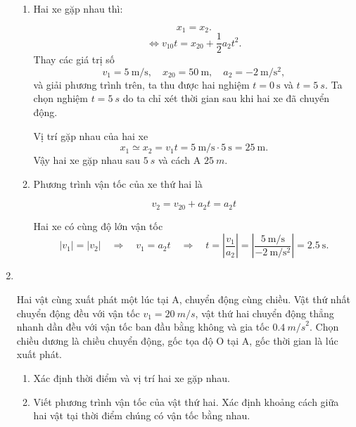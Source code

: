 \begin{enumerate}[label=\bfseries Bài \arabic*:,leftmargin=1.5cm]
{\begin{enumerate}[label=\alph*.]
		$$x_\text{1} = x_{10}+v_{1}t = v_{1}t.$$
		
		$$x_\text{2} = x_{20} + v_{20}t +\dfrac{1}{2}a_2t^2 = x_{20} +\dfrac{1}{2}a_2 t^2.$$
		\item Hai xe gặp nhau thì:
		
		$$x_{1} = x_{2}.$$
		$$\Leftrightarrow  v_{10}t= x_{20} +\dfrac{1}{2}a_2 t^2.$$
		Thay các giá trị số 
		$$v_{1}=\SI{5}{\meter/\second},\quad x_{20}=\SI{50}{\meter},\quad a_2=\SI{-2}{\meter/\second^{2}},$$
		và giải phương trình trên, ta thu được hai nghiệm $t=\SI{0}{\second}$ và $t =\SI{5}{s}.$ Ta chọn nghiệm $t =\SI{5}{s}$ do ta chỉ xét thời gian sau khi hai xe đã chuyển động. 
		
		Vị trí gặp nhau của hai xe
		$$x_1\simeq x_2=v_{1}t=\SI{5}{\meter/\second}\cdot\SI{5}{\second}=\SI{25}{\meter}.$$
		Vậy hai xe gặp nhau sau $\SI{5}{s}$ và cách A $\SI{25}{m}.$
		\item Phương trình vận tốc của xe thứ hai  là
		
		$$v_{2} = v_{20} +a_2t=a_2t$$
		
		Hai xe có cùng độ lớn vận tốc
		$$\left|v_1\right|=\left|v_2\right|\quad\Rightarrow\quad v_1=a_2t\quad\Rightarrow\quad t=\left|\dfrac{v_1}{a_2}\right|=\left|\dfrac{\SI{5}{\meter/\second}}{\SI{-2}{\meter/\second^{2}}}\right|=\SI{2.5}{\second}.$$
	\end{enumerate}
}

\item {}\\
{Hai vật cùng xuất phát một lúc tại A, chuyển động cùng chiều. Vật thứ nhất chuyển động đều với vận tốc $v_1 = \SI{20}{m/s}$, vật thứ hai chuyển động thẳng nhanh dần đều với vận tốc ban đầu bằng không và gia tốc $\SI{0,4}{m/s}^2$. Chọn chiều dương là chiều chuyển động, gốc tọa độ O tại A, gốc thời gian là lúc xuất phát.
	\begin{enumerate}[label=\alph*)]
		\item Xác định thời điểm và vị trí hai xe gặp nhau.
		\item Viết phương trình vận tốc của vật thứ hai. Xác định khoảng cách giữa hai vật tại thời điểm chúng có vận tốc bằng nhau.
	\end{enumerate}
}
\end{enumerate}
